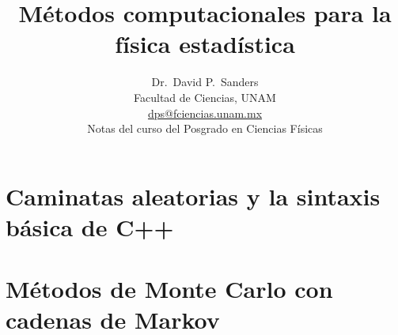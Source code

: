 \documentclass[10pt,twoside,openany, letterpaper]{book}
\newcommand{\captionfonts}{\small}
\begin{document}
\makeatletter  %
\long\def\@makecaption#1#2{%
  \begin{quotation}
  \vskip\abovecaptionskip
  \sbox\@tempboxa{{\captionfonts \noindent \textbf{#1}: #2}}%
  \ifdim \wd\@tempboxa >\hsize
    {\captionfonts \noindent \textbf{#1}: #2\par}
  \else
    \hbox to\hsize{\hfil\box\@tempboxa\hfil}%
  \fi
  \vskip\belowcaptionskip \end{quotation}}
\makeatother   %

\renewcommand{\figurename}{Fig.}
\renewcommand{\partname}{Parte}






\title{\textbf{Métodos computacionales para la física estadística}}
\author{\Large Dr.~David P.~Sanders\\Facultad de Ciencias, UNAM\\
\url{dps@fciencias.unam.mx}\\[20pt]
Notas del curso del Posgrado en Ciencias Físicas 
}
\maketitle



\pagebreak





\part{Caminatas aleatorias y la sintaxis básica de C++}






\part{Métodos de Monte Carlo con cadenas de Markov}





%

\end{document}
